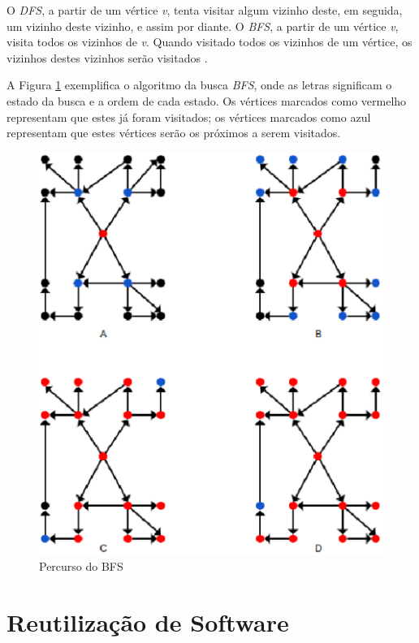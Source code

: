 \begin{apendicesenv}
O \textit{DFS}, a partir de um vértice \textit{v}, tenta visitar algum vizinho deste, em seguida, um vizinho deste vizinho, e assim por diante. O \textit{BFS}, a partir de um vértice \textit{v}, visita todos os vizinhos de \textit{v}. Quando visitado todos os vizinhos de um vértice, os vizinhos destes vizinhos serão visitados \cite{Brassard:1988}.

A Figura \ref{bfs} exemplifica o algoritmo da busca \textit{BFS}, onde as letras significam o estado da busca e a ordem de cada estado. Os vértices marcados como vermelho representam que estes já foram visitados; os vértices marcados como azul representam que estes vértices serão os próximos a serem visitados.

\begin{figure}[!h]
	\centering
	\includegraphics[scale=0.55]{figuras/capitulo2/bfs.eps}
	\caption[Percurso do BFS]{Percurso do BFS \cite{Brassard:1988}}
	\label{bfs}
\end{figure}

\chapter{Reutilização de Software}
\label{chapter:reutilizacao_software}


\end{apendicesenv}
